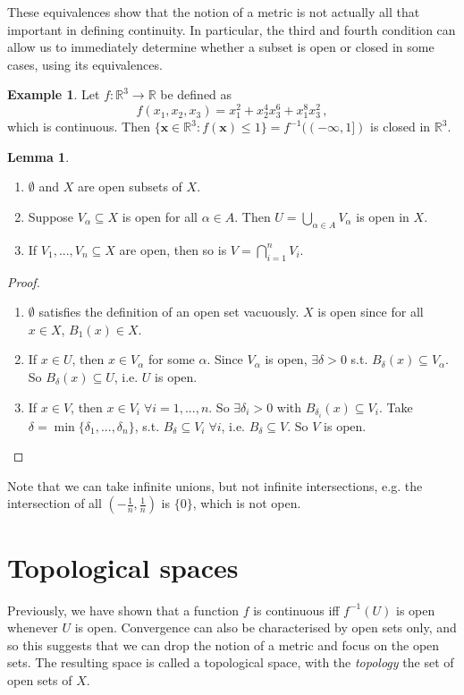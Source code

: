 \documentclass[a4paper,11pt]{article}
\theoremstyle{definition}
\newtheorem*{ex}{Example}
\newtheorem*{lem}{Lemma}
\numberwithin{equation}{section}
\begin{document}
These equivalences show that the notion of a metric is not actually all that important in defining continuity. In particular, the third and fourth condition can allow us to immediately determine whether a subset is open or closed in some cases, using its equivalences.

\begin{ex}
Let $f:\mathbb{R}^3\rightarrow \mathbb{R}$ be defined as
\begin{equation}
    f(x_1,x_2,x_3) = x_1^2 + x_2^4x_3^6 + x_1^8x_3^2\,,
\end{equation}
which is continuous. Then $\{\mathbf{x}\in\mathbb{R}^3:f(\mathbf{x})\leq1\}=f^{-1}((-\infty,1])$ is closed in $\mathbb{R}^3$.
\end{ex}

\begin{lem}
\leavevmode
\begin{enumerate}
    \item $\emptyset$ and $X$ are open subsets of $X$.
    \item Suppose $V_\alpha\subseteq X$ is open for all $\alpha\in A$. Then $U=\bigcup\limits_{\alpha\in A} V_\alpha$ is open in $X$.
    \item If $V_1,...,V_n\subseteq X$ are open, then so is $V=\bigcap\limits_{i=1}^n V_i$.
\end{enumerate}
\end{lem}
\begin{proof}
\leavevmode
\begin{enumerate}
    \item $\emptyset$ satisfies the definition of an open set vacuously. $X$ is open since for all $x\in X$, $B_1(x)\in X$.
    \item If $x\in U$, then $x\in V_\alpha$ for some $\alpha$. Since $V_\alpha$ is open, $\exists\delta>0$ s.t. $B_\delta(x)\subseteq V_\alpha$. So $B_\delta(x)\subseteq U$, i.e. $U$ is open.
    \item If $x\in V$, then $x\in V_i\;\forall i=1,...,n$. So $\exists\delta_i>0$ with $B_{\delta_i}(x)\subseteq V_i$. Take $\delta=\min\{\delta_1,...,\delta_n\}$, s.t. $B_\delta\subseteq V_i\;\forall i$, i.e. $B_\delta\subseteq V$. So $V$ is open.
\end{enumerate}
\end{proof}

Note that we can take infinite unions, but not infinite intersections, e.g. the intersection of all $(-\frac{1}{n},\frac{1}{n})$ is $\{0\}$, which is not open.

\section{Topological spaces}
Previously, we have shown that a function $f$ is continuous iff $f^{-1}(U)$ is open whenever $U$ is open. Convergence can also be characterised by open sets only, and so this suggests that we can drop the notion of a metric and focus on the open sets. The resulting space is called a topological space, with the \emph{topology} the set of open sets of $X$.
\end{document}
